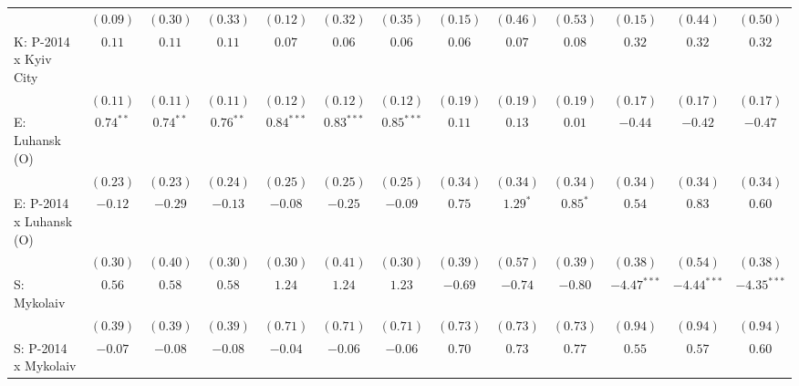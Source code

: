 \begin{table}
\begin{center}
\begin{tiny}
\begin{tabular}{l c c c c c c c c c c c c}
                            & $(0.09)$      & $(0.30)$      & $(0.33)$      & $(0.12)$     & $(0.32)$     & $(0.35)$     & $(0.15)$      & $(0.46)$     & $(0.53)$       & $(0.15)$      & $(0.44)$      & $(0.50)$      \\
K: P-2014 x Kyiv City       & $0.11$        & $0.11$        & $0.11$        & $0.07$       & $0.06$       & $0.06$       & $0.06$        & $0.07$       & $0.08$         & $0.32$        & $0.32$        & $0.32$        \\
                            & $(0.11)$      & $(0.11)$      & $(0.11)$      & $(0.12)$     & $(0.12)$     & $(0.12)$     & $(0.19)$      & $(0.19)$     & $(0.19)$       & $(0.17)$      & $(0.17)$      & $(0.17)$      \\
E: Luhansk (O)              & $0.74^{**}$   & $0.74^{**}$   & $0.76^{**}$   & $0.84^{***}$ & $0.83^{***}$ & $0.85^{***}$ & $0.11$        & $0.13$       & $0.01$         & $-0.44$       & $-0.42$       & $-0.47$       \\
                            & $(0.23)$      & $(0.23)$      & $(0.24)$      & $(0.25)$     & $(0.25)$     & $(0.25)$     & $(0.34)$      & $(0.34)$     & $(0.34)$       & $(0.34)$      & $(0.34)$      & $(0.34)$      \\
E: P-2014 x Luhansk (O)     & $-0.12$       & $-0.29$       & $-0.13$       & $-0.08$      & $-0.25$      & $-0.09$      & $0.75$        & $1.29^{*}$   & $0.85^{*}$     & $0.54$        & $0.83$        & $0.60$        \\
                            & $(0.30)$      & $(0.40)$      & $(0.30)$      & $(0.30)$     & $(0.41)$     & $(0.30)$     & $(0.39)$      & $(0.57)$     & $(0.39)$       & $(0.38)$      & $(0.54)$      & $(0.38)$      \\
S: Mykolaiv                 & $0.56$        & $0.58$        & $0.58$        & $1.24$       & $1.24$       & $1.23$       & $-0.69$       & $-0.74$      & $-0.80$        & $-4.47^{***}$ & $-4.44^{***}$ & $-4.35^{***}$ \\
                            & $(0.39)$      & $(0.39)$      & $(0.39)$      & $(0.71)$     & $(0.71)$     & $(0.71)$     & $(0.73)$      & $(0.73)$     & $(0.73)$       & $(0.94)$      & $(0.94)$      & $(0.94)$      \\
S: P-2014 x Mykolaiv        & $-0.07$       & $-0.08$       & $-0.08$       & $-0.04$      & $-0.06$      & $-0.06$      & $0.70$        & $0.73$       & $0.77$         & $0.55$        & $0.57$        & $0.60$        \\

\end{tabular}
\end{tiny}
\end{center}
\end{table}
